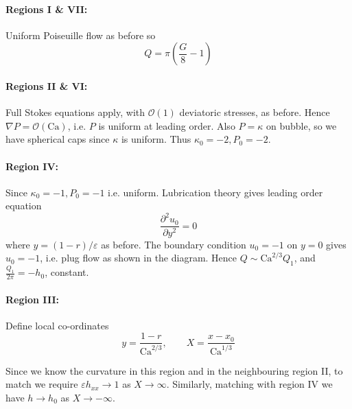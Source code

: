 \documentclass{jknotes}
\begin{document}
\paragraph{Regions I \& VII:}
Uniform Poiseuille flow as before so
\begin{equation}
	Q = \pi (\frac{G}{8} - 1)
\end{equation}

\paragraph{Regions II \& VI:}
Full Stokes equations apply, with $\mathcal{O}(1)$ deviatoric stresses, as
before. Hence $\nabla P = \mathcal{O}(\text{Ca})$, i.e. $P$ is uniform at
leading order. Also $P = \kappa$ on bubble, so we have spherical caps since
$\kappa$ is uniform. Thus $\kappa_0 = -2, P_0 = -2$.

\paragraph{Region IV:}
Since $\kappa_0 = -1, P_0 = -1$ i.e. uniform. Lubrication theory gives leading
order equation
\begin{equation}
	\frac{\partial^2 u_0}{\partial y^2} = 0
\end{equation}
where $y = (1-r)/\varepsilon$ as before. The boundary condition $u_0 = -1$ on
$y=0$ gives $u_0 = -1$, i.e. plug flow as shown in the diagram. Hence $Q \sim
\text{Ca}^{2/3} Q_1$, and $\frac{Q_1}{2\pi} = -h_0$, constant.

\paragraph{Region III:} Define local co-ordinates
\begin{equation}
	y = \frac{1-r}{\text{Ca}^{2/3}}, \hspace{2em} X =
	\frac{x-x_0}{\text{Ca}^{1/3}}
\end{equation}

Since we know the curvature in this region and in the neighbouring region II,
to match we require $\varepsilon h_{xx} \to 1$ as $X \to \infty$. Similarly,
matching with region IV we have $h \to h_0$ as $X \to -\infty$.
\end{document}
